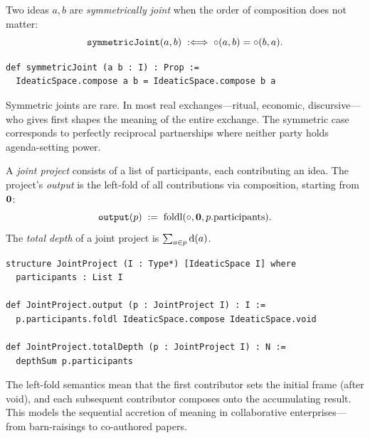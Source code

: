 \begin{definition}
\label{def:symmetricJoint}
Two ideas $a, b$ are \emph{symmetrically joint} when the order of
composition does not matter:
\[
  \texttt{symmetricJoint}(a, b) \;:\Longleftrightarrow\;
  \circ(a, b) = \circ(b, a).
\]
\end{definition}

\begin{lstlisting}[caption={Symmetric joint in Lean}]
def symmetricJoint (a b : I) : Prop :=
  IdeaticSpace.compose a b = IdeaticSpace.compose b a
\end{lstlisting}

Symmetric joints are rare.  In most real exchanges---ritual, economic,
discursive---who gives first shapes the meaning of the entire exchange.
The symmetric case corresponds to perfectly reciprocal partnerships where
neither party holds agenda-setting power.

\begin{definition}
\label{def:JointProject}
A \emph{joint project} consists of a list of participants, each contributing
an idea.  The project's \emph{output} is the left-fold of all contributions
via composition, starting from $\mathbf{0}$:
\[
  \texttt{output}(p) \;:=\; \text{foldl}(\circ, \mathbf{0}, p.\text{participants}).
\]
The \emph{total depth} of a joint project is $\sum_{a \in p} \operatorname{d}(a)$.
\end{definition}

\begin{lstlisting}[caption={Joint project structure in Lean}]
structure JointProject (I : Type*) [IdeaticSpace I] where
  participants : List I

def JointProject.output (p : JointProject I) : I :=
  p.participants.foldl IdeaticSpace.compose IdeaticSpace.void

def JointProject.totalDepth (p : JointProject I) : N :=
  depthSum p.participants
\end{lstlisting}

The left-fold semantics mean that the first contributor sets the initial
frame (after void), and each subsequent contributor composes onto the
accumulating result.  This models the sequential accretion of meaning in
collaborative enterprises---from barn-raisings to co-authored papers.

